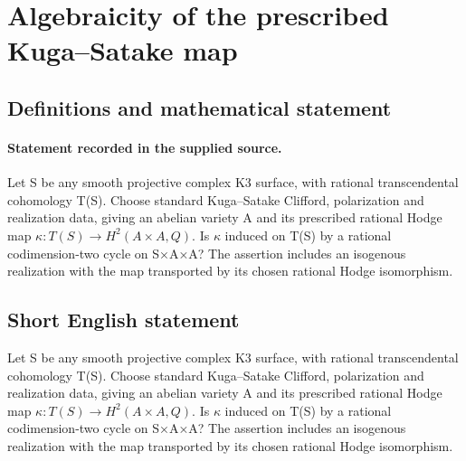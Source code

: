 \documentclass[11pt]{article}
\begin{document}
\section*{Algebraicity of the prescribed Kuga–Satake map}\label{30007007}
\subsection{Definitions and mathematical statement}
\paragraph{Statement recorded in the supplied source.}
Let S be any smooth projective complex K3 surface, with rational transcendental cohomology T(S). Choose standard Kuga–Satake Clifford, polarization and realization data, giving an abelian variety A and its prescribed rational Hodge map $\kappa :T(S)\to H^{2}(A×A,Q)$. Is $\kappa $ induced on T(S) by a rational codimension-two cycle on S×A×A? The assertion includes an isogenous realization with the map transported by its chosen rational Hodge isomorphism.
\subsection{Short English statement}
Let S be any smooth projective complex K3 surface, with rational transcendental cohomology T(S). Choose standard Kuga–Satake Clifford, polarization and realization data, giving an abelian variety A and its prescribed rational Hodge map $\kappa :T(S)\to H^{2}(A×A,Q)$. Is $\kappa $ induced on T(S) by a rational codimension-two cycle on S×A×A? The assertion includes an isogenous realization with the map transported by its chosen rational Hodge isomorphism.
\end{document}
